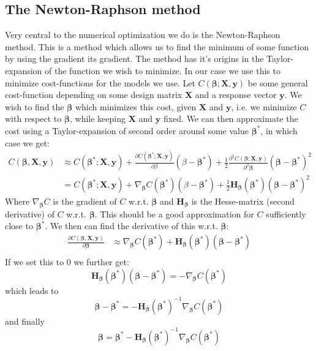 \documentclass{article}
\begin{document}
\subsection{The Newton-Raphson method}
Very central to the numerical optimization we do is the Newton-Raphson method.
This is a method which allows us to find the minimum of some function by using
the gradient its gradient. The method has it's origins in the Taylor-expansion
of the function we wish to minimize. In our case we use this to minimize
cost-functions for the models we use. Let $C(\bm{\beta}; \bm{X}, \bm{y})$ be
some general cost-function depending on some design matrix $\bm{X}$ and a
response vector $\bm{y}$. We wish to find the $\bm{\beta}$ which minimizes this
cost, given $\bm{X}$ and $\bm{y}$, i.e. we minimize $C$ with respect to
$\bm{\beta}$, while keeping $\bm{X}$ and $\bm{y}$ fixed. We can then approximate
the cost using a Taylor-expansion of second order around some value
$\bm{\beta}^*$, in which case we get:
\begin{align*}
      C(\bm{\beta}, \bm{X}, \bm{y}) & \approx C(\bm{\beta}^*; \bm{X}, \bm{y}) + \frac{\partial C(\bm{\beta}^*; \bm{X}, \bm{y})}{\partial \beta}(\beta - \bm{\beta}^*) + \frac{1}{2} \frac{\partial^2 C(\bm{\beta}; \bm{X}, \bm{y})}{\partial^2 \bm{\beta}}(\bm{\beta} - \bm{\beta}^*)^2 \\
                                    & = C(\bm{\beta}^*; \bm{X}, \bm{y}) + \nabla_{\bm{\beta}} C(\bm{\beta}^*) (\beta - \bm{\beta}^*) + \frac{1}{2} \bm{H}_{\bm{\beta}}(\bm{\beta}^*) (\bm{\beta} - \bm{\beta}^*)^2
\end{align*}
Where $\nabla_{\bm{\beta}} C$ is the gradient of $C$ w.r.t. $\bm{\beta}$ and
$\bm{H}_{\bm{\beta}}$ is the Hesse-matrix (second derivative) of $C$ w.r.t.
$\bm{\beta}$. This should be a good approximation for $C$ sufficiently close to
$\bm{\beta}^*$. We then can find the derivative of this w.r.t. $\bm{\beta}$:
\begin{align*}
      \frac{\partial C(\bm{\beta}, \bm{X}, \bm{y})}{\partial \bm{\beta}} & \approx
      \nabla_{\bm{\beta}} C(\bm{\beta}^*) + \bm{H}_{\bm{\beta}}(\bm{\beta}^*)(\bm{\beta} - \bm{\beta}^*) \\
\end{align*}
If we set this to $0$ we further get:
$$\bm{H}_{\bm{\beta}}(\bm{\beta}^*) (\bm{\beta} - \bm{\beta}^*) = -\nabla_{\bm{\beta}} C(\bm{\beta}^*)$$
which leads to
$$\bm{\beta} - \bm{\beta}^* = - \bm{H}_{\bm{\beta}}(\bm{\beta}^*)^{-1} \nabla_{\bm{\beta}} C(\bm{\beta}^*)$$
and finally
$$\bm{\beta} = \bm{\beta}^* - \bm{H}_{\bm{\beta}}(\bm{\beta}^*)^{-1} \nabla_{\bm{\beta}} C(\bm{\beta}^*)$$
\end{document}
